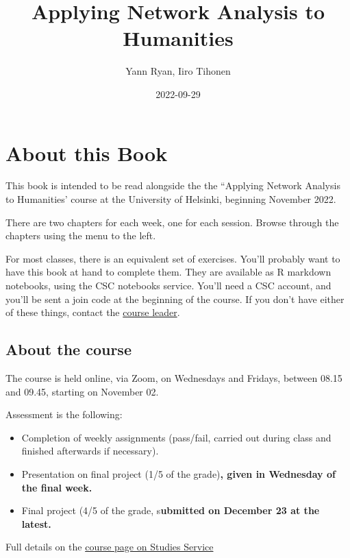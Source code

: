 \documentclass[
]{book}
\title{Applying Network Analysis to Humanities}
\author{Yann Ryan, Iiro Tihonen}
\date{2022-09-29}
\begin{document}
\maketitle

{
\setcounter{tocdepth}{1}
\tableofcontents
}
\hypertarget{about-this-book}{%
\chapter{About this Book}\label{about-this-book}}

This book is intended to be read alongside the the ``Applying Network
Analysis to Humanities' course at the University of Helsinki, beginning
November 2022.

There are two chapters for each week, one for each session. Browse
through the chapters using the menu to the left.

For most classes, there is an equivalent set of exercises. You'll
probably want to have this book at hand to complete them. They are
available as R markdown notebooks, using the CSC notebooks service.
You'll need a CSC account, and you'll be sent a join code at the
beginning of the course. If you don't have either of these things,
contact the \href{mailto:yann.ryan@helinki.fi}{course leader}.

\hypertarget{about-the-course}{%
\section{About the course}\label{about-the-course}}

The course is held online, via Zoom, on Wednesdays and Fridays, between
08.15 and 09.45, starting on November 02.

Assessment is the following:

\begin{itemize}
\item
  Completion of weekly assignments (pass/fail, carried out during
  class and finished afterwards if necessary).
\item
  Presentation on final project (1/5 of the grade)\textbf{, given in
  Wednesday of the final week.}
\item
  Final project (4/5 of the grade, s\textbf{ubmitted on December 23 at the
  latest.}
\end{itemize}

Full details on the \href{https://studies.helsinki.fi/courses/cur/hy-opt-cur-2223-7c9cdedc-fc7b-4e66-b793-1dbe0db868b7}{course page on Studies
Service}
\end{document}
